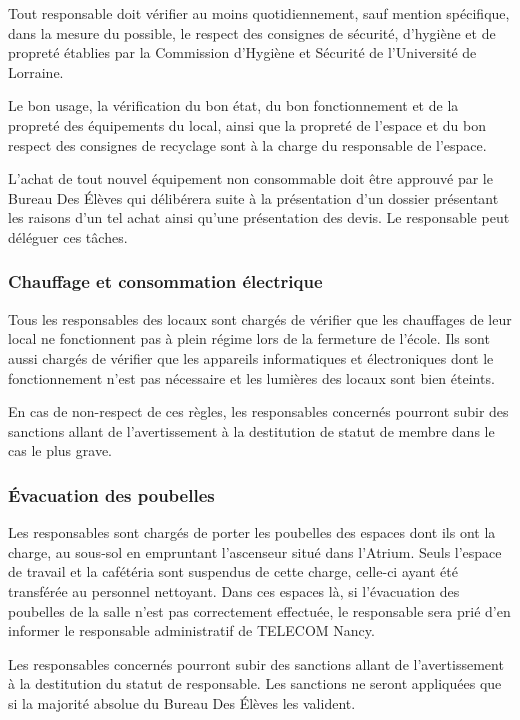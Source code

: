 \documentclass{article} %
\begin{document}
				Tout responsable doit vérifier au moins quotidiennement, sauf
				mention spécifique, dans la mesure du possible, le respect des
				consignes de sécurité, d’hygiène et de propreté établies par la
				Commission d’Hygiène et Sécurité de l’Université de Lorraine.

				Le bon usage, la vérification du bon état, du bon
				fonctionnement et de la propreté des équipements du local, ainsi
				que la propreté de l’espace et du bon respect des consignes de
				recyclage sont à la charge du responsable de l’espace.

				L’achat de tout nouvel équipement non consommable doit être
				approuvé par le Bureau Des Élèves qui délibérera suite à la
				présentation d’un dossier présentant les raisons d’un tel achat
				ainsi qu’une présentation des devis. Le responsable peut
				déléguer ces tâches.

			\subsubsection{Chauffage et consommation électrique}

				Tous les responsables des locaux sont chargés de vérifier que
				les chauffages de leur local ne fonctionnent pas à plein régime
				lors de la fermeture de l’école. Ils sont aussi chargés de
				vérifier que les appareils informatiques et électroniques dont
				le fonctionnement n’est pas nécessaire et les lumières des
				locaux sont bien éteints.

				En cas de non-respect de ces règles, les responsables concernés
				pourront subir des sanctions allant de l’avertissement à la
				destitution de statut de membre dans le cas le plus grave.

			\subsubsection{Évacuation des poubelles}

				Les responsables sont chargés de porter les poubelles des
				espaces dont ils ont la charge, au sous-sol en empruntant
				l’ascenseur situé dans l’Atrium. Seuls l’espace de travail et la
				cafétéria sont suspendus de cette charge, celle-ci ayant été
				transférée au personnel nettoyant. Dans ces espaces là, si
				l’évacuation des poubelles de la salle n’est pas correctement
				effectuée, le responsable sera prié d’en informer le responsable
				administratif de TELECOM Nancy.

				Les responsables concernés pourront subir des sanctions allant
				de l’avertissement à la destitution du statut de responsable.
				Les sanctions ne seront appliquées que si la majorité absolue du
				Bureau Des Élèves les valident.
\end{document}
